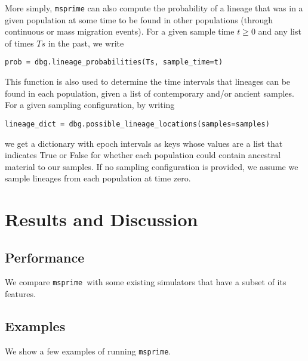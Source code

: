 \documentclass{article}
\newcommand{\msprime}[0]{\texttt{msprime}}
\newcommand{\msprime}[0]{{\texttt{msprime} }}
\begin{document}
More simply, \texttt{msprime} can also compute the probability of a lineage that was in a given
population at some time to be found in other populations (through continuous or mass migration events). 
For a given sample time $t\geq0$ and any list of times $Ts$ in the past, we write
\begin{lstlisting}[frame=single]
prob = dbg.lineage_probabilities(Ts, sample_time=t)
\end{lstlisting}
This function is also used to determine the time intervals that lineages can be found in each population,
given a list of contemporary and/or ancient samples. For a given sampling configuration, by writing
\begin{lstlisting}[frame=single]
lineage_dict = dbg.possible_lineage_locations(samples=samples)
\end{lstlisting}
we get a dictionary with epoch intervals as keys whose values are a list that indicates True or False for 
whether each population could contain ancestral material to our samples.
If no sampling configuration is provided, we assume we sample lineages from each population at time zero.



\section*{Results and Discussion}
\subsection*{Performance}
We compare \msprime\ with some existing simulators that have a subset of its
features.


\subsection*{Examples}
We show a few examples of running \msprime.
\end{document}
